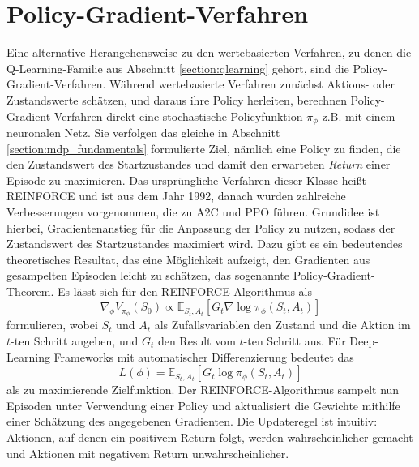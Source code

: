 \section{Policy-Gradient-Verfahren}
Eine alternative Herangehensweise zu den wertebasierten Verfahren, zu denen die Q-Learning-Familie aus Abschnitt \ref{section:qlearning} gehört, sind die Policy-Gradient-Verfahren.
Während wertebasierte Verfahren zunächst Aktions- oder Zustandswerte schätzen, und daraus ihre Policy herleiten, berechnen Policy-Gradient-Verfahren direkt eine stochastische Policyfunktion $\pi_\phi$ z.B. mit einem neuronalen Netz.
Sie verfolgen das gleiche in Abschnitt \ref{section:mdp_fundamentals} formulierte Ziel, nämlich eine Policy zu finden, die den Zustandswert des Startzustandes und damit den erwarteten \textit{Return} einer Episode zu maximieren.
Das ursprüngliche Verfahren dieser Klasse heißt REINFORCE und ist aus dem Jahr 1992, danach wurden zahlreiche Verbesserungen vorgenommen, die zu A2C und PPO führen.
Grundidee ist hierbei, Gradientenanstieg für die Anpassung der Policy zu nutzen, sodass der Zustandswert des Startzustandes maximiert wird.
Dazu gibt es ein bedeutendes theoretisches Resultat, das eine Möglichkeit aufzeigt, den Gradienten aus gesampelten Episoden leicht zu schätzen, das sogenannte Policy-Gradient-Theorem.
Es  lässt sich für den REINFORCE-Algorithmus als
\begin{equation}
    \nabla_\phi V_{\pi_\phi}(S_0) \propto \mathbb{E}_{S_t, A_t}\left[G_t \nabla\log{\pi_\phi(S_t, A_t)}\right]
\end{equation}
formulieren, wobei $S_t$ und $A_t$ als Zufallsvariablen den Zustand und die Aktion im $t$-ten Schritt angeben, und $G_t$ den Result vom $t$-ten Schritt aus.
Für Deep-Learning Frameworks mit automatischer Differenzierung bedeutet das
\begin{equation}
    L(\phi) = \mathbb{E}_{S_t, A_t}\left[G_t \log{\pi_\phi(S_t, A_t)}\right]
\end{equation}
als zu maximierende Zielfunktion.
Der REINFORCE-Algorithmus sampelt nun Episoden unter Verwendung einer Policy und aktualisiert die Gewichte mithilfe einer Schätzung des angegebenen Gradienten.
Die Updateregel ist intuitiv: Aktionen, auf denen ein positivem Return folgt, werden wahrscheinlicher gemacht und Aktionen mit negativem Return unwahrscheinlicher.

